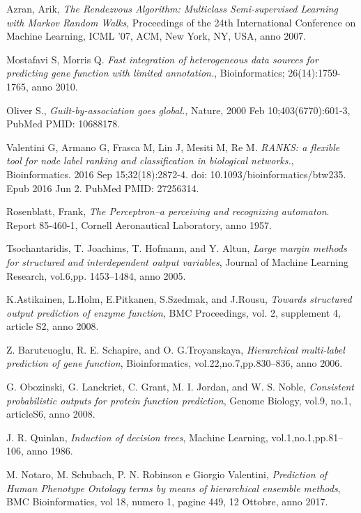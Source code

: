 \documentclass[12pt]{report}
\begin{document}
\begin{thebibliography}{00}
 Azran, Arik, \emph{The Rendezvous Algorithm: Multiclass Semi-supervised Learning with Markov Random Walks}, Proceedings of the 24th International Conference on Machine Learning, ICML '07, ACM, New York, NY, USA, anno 2007.

 Mostafavi S, Morris Q. \emph{Fast integration of heterogeneous data sources for predicting gene function with limited annotation.}, Bioinformatics; 26(14):1759-1765, anno 2010.

 Oliver S., \emph{Guilt-by-association goes global.}, Nature, 2000 Feb 10;403(6770):601-3, PubMed PMID: 10688178.


 Valentini G, Armano G, Frasca M, Lin J, Mesiti M, Re M. \emph{RANKS: a flexible tool for node label ranking and classification in biological networks.}, Bioinformatics. 2016 Sep 15;32(18):2872-4. doi: 10.1093/bioinformatics/btw235. Epub 2016 Jun 2.
PubMed PMID: 27256314.

 Rosenblatt, Frank, \emph{The Perceptron--a perceiving and recognizing automaton}. Report 85-460-1, Cornell Aeronautical Laboratory, anno 1957.

 Tsochantaridis, T. Joachims, T. Hofmann, and Y. Altun, \emph{Large margin methods for structured and interdependent output variables}, Journal of Machine Learning Research, vol.6,pp. 1453–1484, anno 2005.

 K.Astikainen, L.Holm, E.Pitkanen, S.Szedmak, and J.Rousu, \emph{Towards structured output prediction of enzyme function}, BMC Proceedings, vol. 2, supplement 4, article S2, anno 2008.

 Z. Barutcuoglu, R. E. Schapire, and O. G.Troyanskaya, \emph{Hierarchical multi-label prediction of gene function}, Bioinformatics, vol.22,no.7,pp.830–836, anno 2006.

  G. Obozinski, G. Lanckriet, C. Grant, M. I. Jordan, and W. S. Noble, \emph{Consistent probabilistic outputs for protein function
prediction}, Genome Biology, vol.9, no.1, articleS6, anno 2008.

J. R. Quinlan, \emph{Induction of decision trees},
Machine Learning, vol.1,no.1,pp.81–106, anno 1986.

M. Notaro, M. Schubach, P. N. Robinson e Giorgio Valentini, \emph{Prediction of Human Phenotype
Ontology terms by means of hierarchical
ensemble methods}, BMC Bioinformatics, vol 18, numero 1, pagine 449, 12 Ottobre, anno 2017.


\end{thebibliography}
\end{document}
